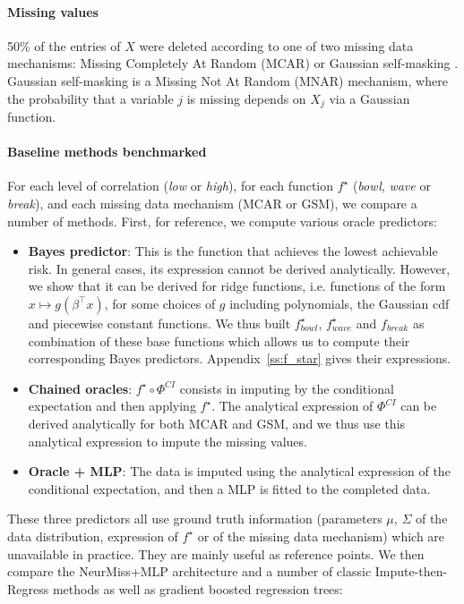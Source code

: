 \documentclass{article}
\theoremstyle{plain}
\begin{document}
\vspace{-0.5em}

\paragraph{Missing values} 50\% of the entries of $X$ were deleted according to one of two missing data mechanisms: Missing Completely At Random (MCAR) or Gaussian self-masking \citep[GSM, see ][]{LeMorvan2020NeuMiss}. Gaussian self-masking is a Missing Not At Random (MNAR) mechanism, where the probability that a variable $j$ is missing depends on $X_j$ via a Gaussian function.

\paragraph{Baseline methods benchmarked}
For each level of correlation (\emph{low} or \emph{high}), for each function $f^\star$ (\emph{bowl}, \emph{wave} or \emph{break}), and each missing data mechanism (MCAR or GSM), we compare a number of methods. First, for reference, we compute various oracle predictors:
\begin{itemize}[itemsep=0ex, topsep=0ex, partopsep=0.5ex, parsep=0.5ex, leftmargin=2.5ex]
    \item \textbf{Bayes predictor}: This is the function that achieves the lowest achievable risk. In general cases, its expression cannot be derived analytically. However, we show that it can be derived for ridge functions, i.e. functions of the form $x \mapsto g(\beta^\top x)$, for some choices of $g$ including polynomials, the Gaussian cdf and piecewise constant functions. We thus built $f^\star_{bowl}$, $f^\star_{wave}$ and $f_{break}$ as combination of these base functions which allows us to compute their corresponding Bayes predictors.  Appendix~\ref{ss:f_star} gives their expressions.
    \item \textbf{Chained oracles}: $f^\star \circ \Phi^{CI}$ consists in imputing by the conditional expectation and then applying $f^\star$. The analytical expression of $\Phi^{CI}$ can be derived analytically for both MCAR and GSM, and we thus use this analytical expression to impute the missing values.
    \item \textbf{Oracle + MLP}: The data is imputed using the analytical expression of the conditional expectation, and then a MLP is fitted to the completed data.
\end{itemize}
These three predictors all use ground truth information (parameters $\mu$, $\Sigma$ of the data distribution, expression of $f^\star$ or of the missing data mechanism) which are unavailable in practice. They are mainly useful as reference points. We then compare the NeurMiss+MLP architecture and a number of classic Impute-then-Regress methods as well as gradient boosted regression trees:
\end{document}
